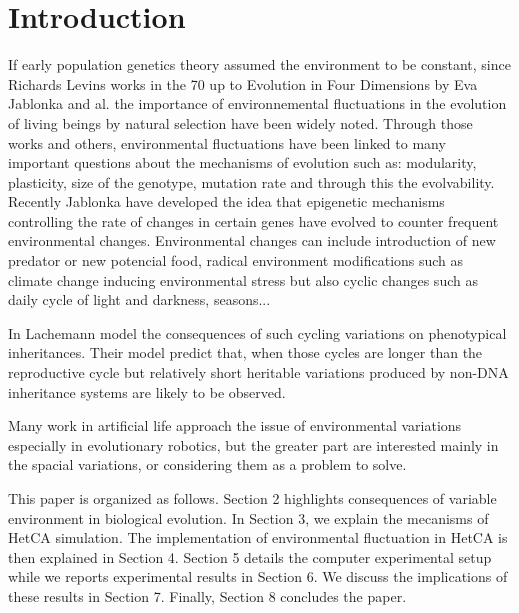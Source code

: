 \documentclass{sig-alternate-05-2015}
\begin{document}


\section{Introduction}
If early population genetics theory assumed the environment to be constant, since Richards Levins works \cite{levins1968evolution} in the 70 up to Evolution in Four Dimensions by Eva Jablonka and al. \cite{jablonka2014evolution} the importance of environnemental fluctuations in the evolution of living beings by natural selection have been widely noted. Through those works and others, environmental fluctuations have been linked to many important questions about the mechanisms of evolution such as: modularity, plasticity, size of the genotype, mutation rate and through this the evolvability. Recently Jablonka\cite{jablonka2014evolution} have developed the idea that epigenetic mechanisms controlling the rate of changes in certain genes have evolved to counter frequent environmental changes. 
Environmental changes can include introduction of new predator or new potencial food, radical environment modifications such as climate change inducing environmental stress but also cyclic changes such as daily cycle of light and darkness, seasons...  

In \cite{lachmann1996inheritance} Lachemann model the consequences of such cycling variations on phenotypical inheritances. Their model predict that, when those cycles are longer than the reproductive cycle but relatively short heritable variations produced by non-DNA inheritance systems are likely to be observed.

Many work in artificial life approach the issue of environmental variations especially in evolutionary robotics\cite{floreano2000evolutionary}, but the greater part are interested mainly in the spacial variations, or considering them as a problem to solve.

This paper is organized as follows. Section 2 highlights consequences of variable environment in biological evolution. In Section 3, we explain the mecanisms of HetCA simulation. The implementation of environmental fluctuation in HetCA  is then explained in Section 4. Section 5 details the computer experimental setup while we reports experimental results in Section 6. We discuss the implications of these results in Section 7. Finally, Section 8 concludes the paper.
\end{document}
